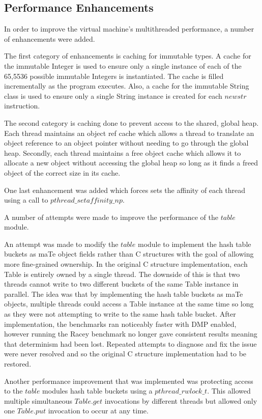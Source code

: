 \subsection{Performance Enhancements}

In order to improve the virtual machine's multithreaded performance, a
number of enhancements were added.

The first category of enhancements is caching for immutable types.  A
cache for the immutable Integer is used to ensure only a single
instance of each of the 65,5536 possible immutable Integers is
instantiated.  The cache is filled incrementally as the program
executes.  Also, a cache for the immutable String class is used to
ensure only a single String instance is created for each $newstr$
instruction.

The second category is caching done to prevent access to the shared,
global heap.  Each thread maintains an object ref cache which allows a
thread to translate an object reference to an object pointer without
needing to go through the global heap.  Secondly, each thread
maintains a free object cache which allows it to allocate a new object
without accessing the global heap so long as it finds a freed object
of the correct size in its cache.

One last enhancement was added which forces sets the affinity of each
thread using a call to $pthread\_setaffinity\_np$.

A number of attempts were made to improve the performance of the
$table$ module.

An attempt was made to modify the $table$ module to implement the hash
table buckets as maTe object fields rather than C structures with the
goal of allowing more fine-grained ownership.  In the original C
structure implementation, each Table is entirely owned by a single
thread.  The downside of this is that two threads cannot write to two
different buckets of the same Table instance in parallel.  The idea
was that by implementing the hash table buckets as maTe objects,
multiple threads could access a Table instance at the same time so
long as they were not attempting to write to the same hash table
bucket.  After implementation, the benchmarks ran noticeably faster
with DMP enabled, however running the Racey benchmark no longer gave
consistent results meaning that determinism had been lost.  Repeated
attempts to diagnose and fix the issue were never resolved and so the
original C structure implementation had to be restored.

Another performance improvement that was implemented was protecting
access to the $table$ modules hash table buckets using a
$pthread\_rwlock\_t$.  This allowed multiple simultaneous $Table.get$
invocations by different threads but allowed only one $Table.put$
invocation to occur at any time.


